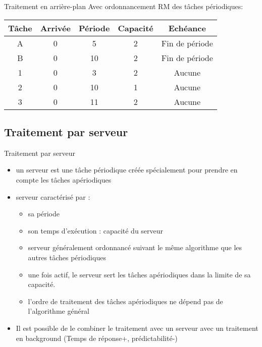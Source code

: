 \begin{frame}{Traitement en arrière-plan} 
  Avec ordonnancement RM des tâches périodiques:
  \begin{center}
    \begin{tabular}{ccccc}
      \hline
      Tâche & Arrivée & Période & Capacité & Echéance \\
      \hline
      A & 0 &  5 & 2 & Fin de période\\
      B & 0 & 10 & 2 & Fin de période\\
      1 & 0 &  3 & 2 & Aucune\\
      2 & 0 & 10 & 1 & Aucune\\
      3 & 0 & 11 & 2 & Aucune\\
      \hline
    \end{tabular}
  \end{center}
\end{frame} 

\subsection{Traitement par serveur}

\begin{frame}{Traitement par serveur} 
  \begin{itemize}
  \item un  serveur est une  tâche périodique créée  spécialement pour
    prendre en compte les tâches apériodiques
  \item serveur caractérisé par :
    \begin{itemize}
    \item sa période 
    \item son temps d'exécution : capacité du serveur  
    \item serveur  généralement ordonnancé suivant  le même algorithme
      que les autres tâches périodiques
    \item une fois actif, le serveur sert les tâches apériodiques dans
      la limite de sa capacité.
    \item l'ordre de traitement  des tâches apériodiques ne dépend pas
      de l'algorithme général
    \end{itemize}
  \item Il est  possible de le combiner le  traitement avec un serveur
    avec   un   traitement   en   background   (Temps   de   réponse+,
    prédictabilité-)
  \end{itemize}
\end{frame}

